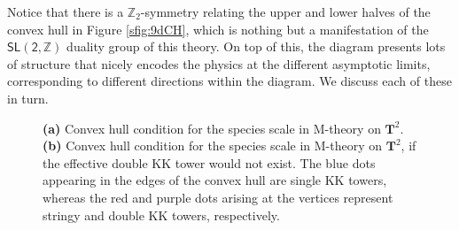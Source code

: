 Notice that there is a  $\mathbb{Z}_2$-symmetry relating the upper and lower halves of the convex hull in Figure \ref{sfig:9dCH}, which is nothing but a manifestation of the $\mathsf{SL(2, \mathbb{Z})}$ duality group of this theory. On top of this, the diagram presents lots of structure that nicely encodes the physics at the different asymptotic limits, corresponding to different directions within the diagram. We discuss each of these in turn.

\begin{figure}[htb]
		\begin{center}
            \quad
			\small \caption{\textbf{(a)} Convex hull condition for the species scale in M-theory on $\mathbf{T}^2$. \textbf{(b)} Convex hull condition for the species scale in M-theory on $\mathbf{T}^2$, if the effective double KK tower would not exist. The blue dots appearing in the edges of the convex hull are single KK towers, whereas the red and purple dots arising at the vertices represent stringy and double KK towers, respectively.}
			\label{fig:ch1}
		\end{center}
\end{figure} 

